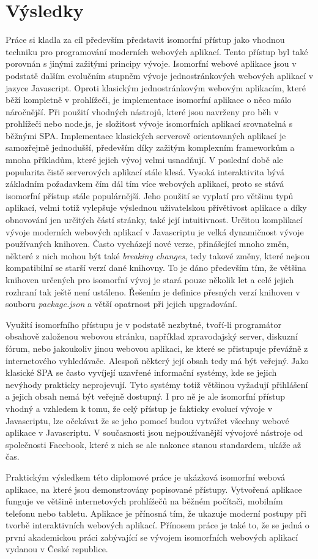 \chapter{Výsledky}
Práce si kladla za cíl především představit isomorfní přístup jako vhodnou techniku pro programování moderních webových aplikací. Tento přístup byl také porovnán s jinými zažitými principy vývoje. Isomorfní webové aplikace jsou v podstatě dalším evolučním stupněm vývoje jednostránkových webových aplikací v jazyce Javascript. Oproti klasickým jednostránkovým webovým aplikacím, které běží kompletně v prohlížeči, je implementace isomorfní aplikace o něco málo náročnější. Při použití vhodných nástrojů, které jsou navrženy pro běh v prohlížeči nebo node.js, je složitost vývoje isomorfních aplikací srovnatelná s běžnými SPA. Implementace klasických serverově orientovaných aplikací je samozřejmě jednodušší, především díky zažitým komplexním frameworkům a mnoha příkladům, které jejich vývoj velmi usnadňují. V poslední době ale popularita čistě serverových aplikací stále klesá. Vysoká interaktivita bývá základním požadavkem čím dál tím více webových aplikací, proto se stává isomorfní přístup stále populárnější. Jeho použití se vyplatí pro většinu typů aplikací, velmi totiž vylepšuje výslednou uživatelskou přívětivost aplikace a díky obnovování jen určitých částí stránky, také její intuitivnost. Určitou komplikací vývoje moderních webových aplikací v Javascriptu je velká dynamičnost vývoje používaných knihoven. Často vycházejí nové verze, přinášející mnoho změn, některé z nich mohou být také \textit{breaking changes}, tedy takové změny, které nejsou kompatibilní se starší verzí dané knihovny. To je dáno především tím, že většina knihoven určených pro isomorfní vývoj je stará pouze několik let a celé jejich rozhraní tak ještě není ustáleno. Řešením je definice přesných verzí knihoven v souboru \textit{package.json} a větší opatrnost při jejich upgradování.

Využití isomorfního přístupu je v podstatě nezbytné, tvoří-li programátor obsahově založenou webovou stránku, například zpravodajský server, diskuzní fórum, nebo jakoukoliv jinou webovou aplikaci, ke které se přistupuje převážně z internetového vyhledávače. Alespoň některý její obsah tedy má být veřejný. Jako klasické SPA se často vyvíjejí uzavřené informační systémy, kde se jejich nevýhody prakticky neprojevují. Tyto systémy totiž většinou vyžadují přihlášení a jejich obsah nemá být veřejně dostupný. I pro ně je ale isomorfní přístup vhodný a vzhledem k tomu, že celý přístup je fakticky evolucí vývoje v Javascriptu, lze očekávat že se jeho pomocí budou vytvářet všechny webové aplikace v Javascriptu. V současnosti jsou nejpoužívanější vývojové nástroje od společnosti Facebook, které z nich se ale nakonec stanou standardem, ukáže až čas.

Praktickým výsledkem této diplomové práce je ukázková isomorfní webová aplikace, na které jsou demonstrovány popisované přístupy. Vytvořená aplikace funguje ve většině internetových prohlížečů na běžném počítači, mobilním telefonu nebo tabletu. Aplikace je přínosná tím, že ukazuje moderní postupy při tvorbě interaktivních webových aplikací. Přínosem práce je také to, že se jedná o první akademickou práci zabývající se vývojem isomorfních webových aplikací vydanou v České republice.
